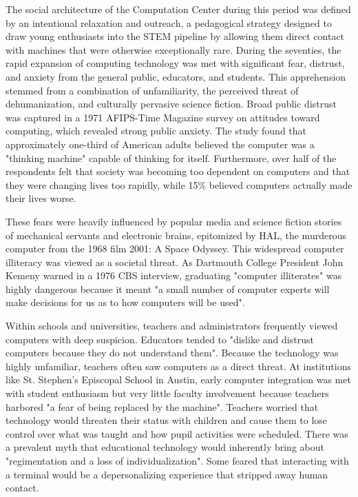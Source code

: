 The social architecture of the Computation Center during this period was defined by an intentional relaxation and outreach, a pedagogical strategy designed to draw young enthusiasts into the STEM pipeline by allowing them direct contact with machines that were otherwise exceptionally rare. During the seventies, the rapid expansion of computing technology was met with significant fear, distrust, and anxiety from the general public, educators, and students. This apprehension stemmed from a combination of unfamiliarity, the perceived threat of dehumanization, and culturally pervasive science fiction. Broad public distrust was captured in a 1971 AFIPS-Time Magazine survey on attitudes toward computing, which revealed strong public anxiety. The study found that approximately one-third of American adults believed the computer was a "thinking machine" capable of thinking for itself. Furthermore, over half of the respondents felt that society was becoming too dependent on computers and that they were changing lives too rapidly, while 15\% believed computers actually made their lives worse.

These fears were heavily influenced by popular media and science fiction stories of mechanical servants and electronic brains, epitomized by HAL, the murderous computer from the 1968 film 2001: A Space Odyssey. This widespread computer illiteracy was viewed as a societal threat. As Dartmouth College President John Kemeny warned in a 1976 CBS interview, graduating "computer illiterates" was highly dangerous because it meant "a small number of computer experts will make decisions for us as to how computers will be used".

Within schools and universities, teachers and administrators frequently viewed computers with deep suspicion. Educators tended to "dislike and distrust computers because they do not understand them". Because the technology was highly unfamiliar, teachers often saw computers as a direct threat. At institutions like St. Stephen's Episcopal School in Austin, early computer integration was met with student enthusiasm but very little faculty involvement because teachers harbored "a fear of being replaced by the machine". Teachers worried that technology would threaten their status with children and cause them to lose control over what was taught and how pupil activities were scheduled. There was a prevalent myth that educational technology would inherently bring about "regimentation and a loss of individualization". Some feared that interacting with a terminal would be a depersonalizing experience that stripped away human contact.

